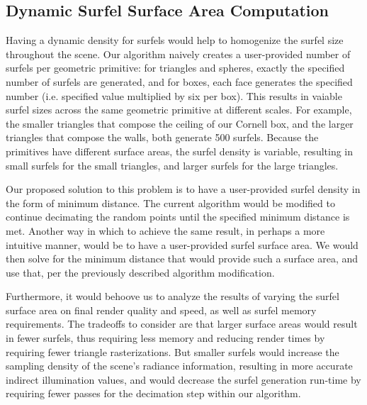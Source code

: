 \subsection{Dynamic Surfel Surface Area Computation}
Having a dynamic density for surfels would help to homogenize the surfel size throughout the scene. Our algorithm naively creates a user-provided number of surfels per geometric primitive: for triangles and spheres, exactly the specified number of surfels are generated, and for boxes, each face generates the specified number (i.e. specified value multiplied by six per box). This results in vaiable surfel sizes across the same geometric primitive at different scales. For example, the smaller triangles that compose the ceiling of our Cornell box, and the larger triangles that compose the walls, both generate 500 surfels. Because the primitives have different surface areas, the surfel density is variable, resulting in small surfels for the small triangles, and larger surfels for the large triangles.

Our proposed solution to this problem is to have a user-provided surfel density in the form of minimum distance. The current algorithm would be modified to continue decimating the random points until the specified minimum distance is met. Another way in which to achieve the same result, in perhaps a more intuitive manner, would be to have a user-provided surfel surface area. We would then solve for the minimum distance that would provide such a surface area, and use that, per the previously described algorithm modification.

Furthermore, it would behoove us to analyze the results of varying the surfel surface area on final render quality and speed, as well as surfel memory requirements. The tradeoffs to consider are that larger surface areas would result in fewer surfels, thus requiring less memory and reducing render times by requiring fewer triangle rasterizations. But smaller surfels would increase the sampling density of the scene's radiance information, resulting in more accurate indirect illumination values, and would decrease the surfel generation run-time by requiring fewer passes for the decimation step within our algorithm.

